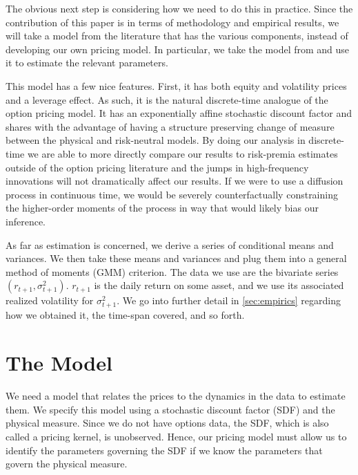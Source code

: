\documentclass[11pt, letterpaper, twoside]{article}
\begin{document}
The obvious next step is considering how we need to do this in practice. Since the contribution of this paper is in terms of methodology and empirical results, we will take a model from the literature that has the various components, instead of developing our own pricing model. In particular, we take the model from \textcite{han2018leverage} and use it to estimate the relevant parameters. 

This model has a few nice features. First, it has both equity and volatility prices and a leverage effect. As such, it is the natural discrete-time analogue of the \textcite{heston1993closedform} option pricing model. It has an exponentially affine stochastic discount factor and shares with \textcite{heston1993closedform} the advantage of having a structure preserving change of measure between the physical and risk-neutral models. By doing our analysis in discrete-time we are able to more directly compare our results to risk-premia estimates outside of the option pricing literature and the jumps in high-frequency innovations will not dramatically affect our results. If we were to use a diffusion process in continuous time, we would be severely counterfactually constraining the higher-order moments of the process in way that would likely bias our inference. 

As far as estimation is concerned, we derive a series of conditional means and variances. We then take these means and variances and plug them into a general method of moments (GMM) criterion. The data we use are the bivariate series $(r_{t+1}, \sigma^2_{t+1})$. $r_{t+1}$ is the daily return on some asset, and we use its associated realized volatility for $\sigma^2_{t+1}$. We go into further detail in \cref{sec:empirics} regarding how we obtained it, the time-span covered, and so forth.

\section{The Model}\label{sec:model}

\addtocounter{subsection}{1}

We need a model that relates the prices to the dynamics in the data to estimate them.  We specify this model using a  stochastic discount factor (SDF) and the physical measure. Since we do not have options data, the SDF, which is also called a pricing kernel, is unobserved. Hence, our pricing model must allow us to identify the parameters governing the  SDF  if we know the parameters that govern the physical measure. 
\end{document}
